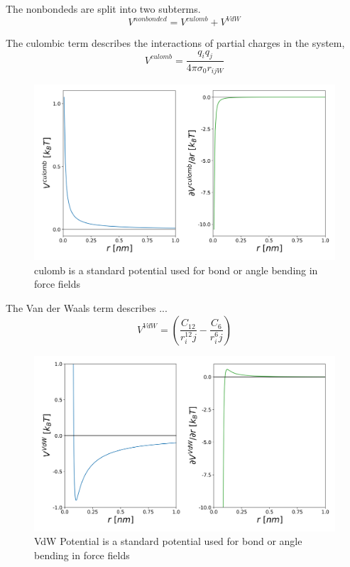 The nonbondeds are split into two subterms.
\begin{equation}
    V^{nonbonded}  = V^{culomb} + V^{VdW} 
\end{equation}

The culombic term describes the interactions of partial charges in the system, 
\begin{equation}
    V^{culomb}  = \frac{q_i q_j}{4 \pi \sigma_0 r_{ijW}}
\end{equation}
\begin{figure}[h]
    \centering
    \includegraphics[width=\textwidth]{fig/ForceField/culomb.png}
    \caption{culomb is a standard potential used for bond or angle bending in force fields}
    \label{fig:culomb}
\end{figure}

The Van der Waals term describes ... 
\begin{equation}
    V^{VdW}  = (\frac{C_12}{r^{12}_ij}-\frac{C_6}{r^{6}_ij}) 
\end{equation}
\begin{figure}[h]
    \centering
    \includegraphics[width=\textwidth]{fig/ForceField/vdw.png}
    \caption{VdW Potential is a standard potential used for bond or angle bending in force fields}
    \label{fig:VdW}
\end{figure}

